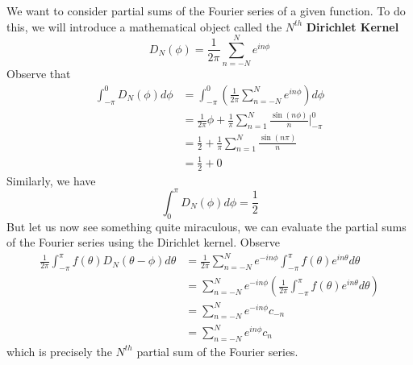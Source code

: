 We want to consider partial sums of the Fourier series of a
given function. To do this, we will introduce a mathematical
object called the $N^{th}$ \textbf{Dirichlet Kernel}
\begin{equation}
D_{N}(\phi) = \frac{1}{2\pi}\sum^{N}_{n=-N}e^{in\phi}
\end{equation}
Observe that
\begin{subequations}
\begin{align}
\int^{0}_{-\pi}D_{N}(\phi)d\phi &=
\int^{0}_{-\pi}\left(\frac{1}{2\pi}\sum^{N}_{n=-N}e^{in\phi}\right)d\phi\\
&= \frac{1}{2\pi}\phi +
\frac{1}{\pi}\sum^{N}_{n=1}\frac{\sin(n\phi)}{n}\Big|^{0}_{-\pi}\\
&=\frac{1}{2}+\frac{1}{\pi}\sum^{N}_{n=1}\frac{\sin(n\pi)}{n}\\
&=\frac{1}{2}+0
\end{align}
\end{subequations}
Similarly, we have
\begin{equation}
\int^{\pi}_{0}D_{N}(\phi)d\phi = \frac{1}{2}
\end{equation}
But let us now see something quite miraculous, we can
evaluate the partial sums of the Fourier series using the
Dirichlet kernel. Observe
\begin{subequations}
\begin{align}
\frac{1}{2\pi}\int^{\pi}_{-\pi}f(\theta)D_{N}(\theta-\phi)d\theta
&=
\frac{1}{2\pi}\sum^{N}_{n=-N}e^{-in\phi}\int^{\pi}_{-\pi}f(\theta)e^{in\theta}d\theta\\
&=\sum^{N}_{n=-N}e^{-in\phi}\left(\frac{1}{2\pi}\int^{\pi}_{-\pi}f(\theta)e^{in\theta}d\theta\right)\\
&=\sum^{N}_{n=-N}e^{-in\phi}c_{-n}\\
&=\sum^{N}_{n=-N}e^{in\phi}c_{n}
\end{align}
\end{subequations}
which is precisely the $N^{th}$ partial sum of the Fourier series.
